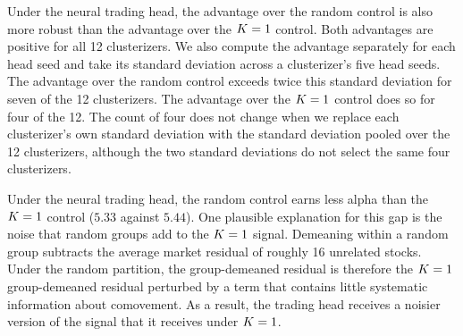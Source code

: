 Under the neural trading head, the advantage over the random control is also more robust than the advantage over the $K=1$ control. Both advantages are positive for all 12 clusterizers. We also compute the advantage separately for each head seed and take its standard deviation across a clusterizer's five head seeds. The advantage over the random control exceeds twice this standard deviation for seven of the 12 clusterizers. The advantage over the $K=1$ control does so for four of the 12. The count of four does not change when we replace each clusterizer's own standard deviation with the standard deviation pooled over the 12 clusterizers, although the two standard deviations do not select the same four clusterizers.

Under the neural trading head, the random control earns less alpha than the $K=1$ control ($5.33$ against $5.44$). One plausible explanation for this gap is the noise that random groups add to the $K=1$ signal. Demeaning within a random group subtracts the average market residual of roughly 16 unrelated stocks. Under the random partition, the group-demeaned residual is therefore the $K=1$ group-demeaned residual perturbed by a term that contains little systematic information about comovement. As a result, the trading head receives a noisier version of the signal that it receives under $K=1$.



